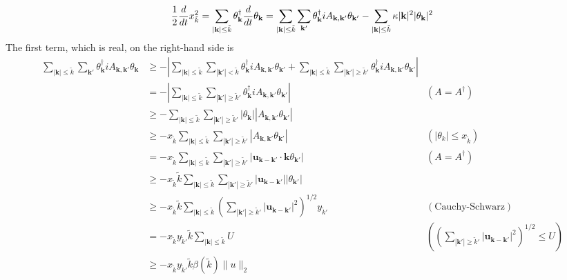 \documentclass[12pt]{article}
\begin{document}
\begin{equation}
\label{eq:xktilde}
\frac{1}{2}\frac{d}{dt}x^2_{\tilde{k}}=\sum_{|\mathbf{k}|\leq\tilde{k}}\theta_{\mathbf{k}}^{\dagger}\frac{d}{dt}\theta_{\mathbf{k}}=\sum_{|\mathbf{k}|\leq\tilde{k}}\sum_{\mathbf{k}'}\theta_{\mathbf{k}}^{\dagger}iA_{\mathbf{k},\mathbf{k'}}\theta_{\mathbf{k}'} - \sum_{|\mathbf{k}|\leq\tilde{k}} \kappa |\mathbf{k}|^{2}|\theta_{\mathbf{k}}|^{2}\\
\end{equation}
The first term, which is real, on the right-hand side is
\begin{align}
\sum_{|\mathbf{k}|\leq\tilde{k}}\sum_{\mathbf{k}'}\theta_{\mathbf{k}}^{\dagger}iA_{\mathbf{k},\mathbf{k'}}\theta_{\mathbf{k}}
&\geq -\left|\sum_{|\mathbf{k}|\leq\tilde{k}}\sum_{|\mathbf{k}'|< \tilde{k}}\theta_{\mathbf{k}}^{\dagger}iA_{\mathbf{k},\mathbf{k'}}\theta_{\mathbf{k}'} + \sum_{|\mathbf{k}|\leq\tilde{k}}\sum_{|\mathbf{k}'|\geq \tilde{k}'}\theta_{\mathbf{k}}^{\dagger}iA_{\mathbf{k},\mathbf{k}'}\theta_{\mathbf{k}'} \right| & \\
& =- \left|\sum_{|\mathbf{k}|\leq\tilde{k}}\sum_{|\mathbf{k}'|\geq \tilde{k}'}\theta_{\mathbf{k}}^{\dagger}iA_{\mathbf{k},\mathbf{k'}}\theta_{\mathbf{k}'}\right| &  (A=A^{\dagger})  \\
& \geq -\sum_{|\mathbf{k}|\leq\tilde{k}}\sum_{|\mathbf{k}'|\geq \tilde{k}'}|\theta_{\mathbf{k}}||A_{\mathbf{k},\mathbf{k'}}\theta_{\mathbf{k}'}|&  \\
&\geq - x_{\tilde{k}} \sum_{|\mathbf{k}|\leq\tilde{k}}\sum_{|\mathbf{k}'|\geq \tilde{k}'}|A_{\mathbf{k},\mathbf{k'}}\theta_{\mathbf{k}'}| & (|\theta_{k}|\leq x_{\tilde{k}} )  \\
&=  - x_{\tilde{k}} \sum_{|\mathbf{k}|\leq\tilde{k}}\sum_{|\mathbf{k}'|\geq \tilde{k}'}|\mathbf{u}_{\mathbf{k}-\mathbf{k}'}\cdot \mathbf{k}\theta_{\mathbf{k}'}| &  (A=A^{\dagger})  \\
&\geq  - x_{\tilde{k}} \tilde{k}\sum_{|\mathbf{k}|\leq\tilde{k}}\sum_{|\mathbf{k}'|\geq \tilde{k}'}|\mathbf{u}_{\mathbf{k}-\mathbf{k}'}||\theta_{\mathbf{k}'}| &   \\
&\geq  - x_{\tilde{k}} \tilde{k} \sum_{|\mathbf{k}|\leq\tilde{k}}\left(\sum_{|\mathbf{k}'|\geq \tilde{k}'}|\mathbf{u}_{\mathbf{k}-\mathbf{k}'}|^{2} \right)^{1/2} y_{\tilde{k}'}& (\text{Cauchy-Schwarz})   \\
&=  - x_{\tilde{k}} y_{\tilde{k}'}\tilde{k} \sum_{|\mathbf{k}|\leq\tilde{k}}U&\left(\left(\sum_{|\mathbf{k}'|\geq \tilde{k}'}|\mathbf{u}_{\mathbf{k}-\mathbf{k}'}|^{2} \right)^{1/2}\leq U\right)  \\
&\geq  - x_{\tilde{k}}y_{\tilde{k}'} \tilde{k}\beta(\tilde{k}) \|u\|_{2} & 
\end{align}
\end{document}
